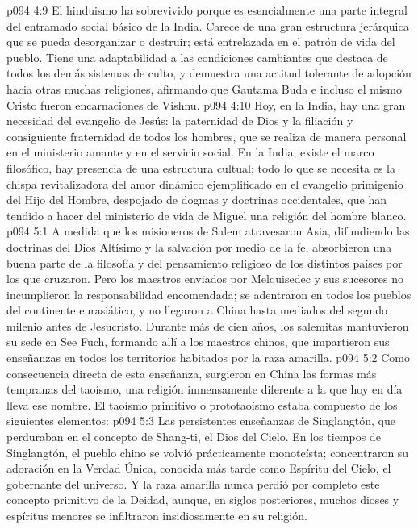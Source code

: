\vs p094 4:9 El hinduismo ha sobrevivido porque es esencialmente una parte integral del entramado social básico de la India. Carece de una gran estructura jerárquica que se pueda desorganizar o destruir; está entrelazada en el patrón de vida del pueblo. Tiene una adaptabilidad a las condiciones cambiantes que destaca de todos los demás sistemas de culto, y demuestra una actitud tolerante de adopción hacia otras muchas religiones, afirmando que Gautama Buda e incluso el mismo Cristo fueron encarnaciones de Vishnu.
\vs p094 4:10 Hoy, en la India, hay una gran necesidad del evangelio de Jesús: la paternidad de Dios y la filiación y consiguiente fraternidad de todos los hombres, que se realiza de manera personal en el ministerio amante y en el servicio social. En la India, existe el marco filosófico, hay presencia de una estructura cultual; todo lo que se necesita es la chispa revitalizadora del amor dinámico ejemplificado en el evangelio primigenio del Hijo del Hombre, despojado de dogmas y doctrinas occidentales, que han tendido a hacer del ministerio de vida de Miguel una religión del hombre blanco.
\vs p094 5:1 A medida que los misioneros de Salem atravesaron Asia, difundiendo las doctrinas del Dios Altísimo y la salvación por medio de la fe, absorbieron una buena parte de la filosofía y del pensamiento religioso de los distintos países por los que cruzaron. Pero los maestros enviados por Melquisedec y sus sucesores no incumplieron la responsabilidad encomendada; se adentraron en todos los pueblos del continente eurasiático, y no llegaron a China hasta mediados del segundo milenio antes de Jesucristo. Durante más de cien años, los salemitas mantuvieron su sede en See Fuch, formando allí a los maestros chinos, que impartieron sus enseñanzas en todos los territorios habitados por la raza amarilla.
\vs p094 5:2 Como consecuencia directa de esta enseñanza, surgieron en China las formas más tempranas del taoísmo, una religión inmensamente diferente a la que hoy en día lleva ese nombre. El taoísmo primitivo o prototaoísmo estaba compuesto de los siguientes elementos:
\vs p094 5:3 Las persistentes enseñanzas de Singlangtón, que perduraban en el concepto de Shang\hyp{}ti, el Dios del Cielo. En los tiempos de Singlangtón, el pueblo chino se volvió prácticamente monoteísta; concentraron su adoración en la Verdad Única, conocida más tarde como Espíritu del Cielo, el gobernante del universo. Y la raza amarilla nunca perdió por completo este concepto primitivo de la Deidad, aunque, en siglos posteriores, muchos dioses y espíritus menores se infiltraron insidiosamente en su religión.
